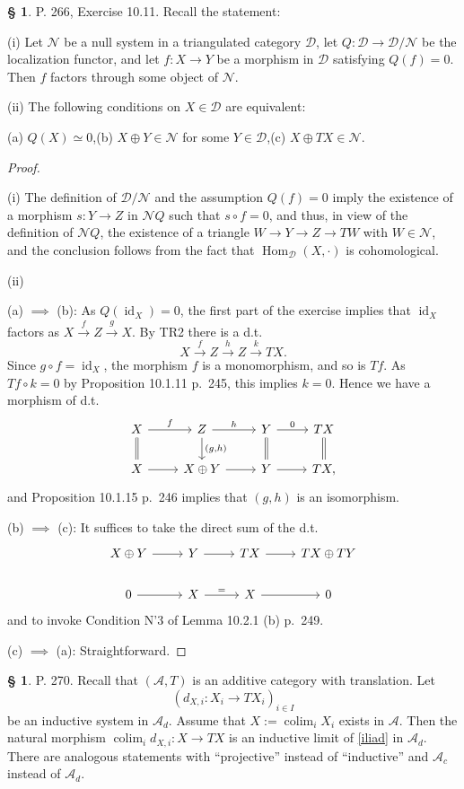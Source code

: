 \documentclass[12pt]{article}
\theoremstyle{remark}
\theoremstyle{definition}
\newtheorem{s}[thm]{\S}
\newcommand{\cc}{\mathcal}
\newcommand{\A}{\mathcal A}
\newcommand{\xr}{\xrightarrow}
\DeclareMathOperator*{\co}{colim}
\DeclareMathOperator{\id}{id}
\DeclareMathOperator{\Hom}{Hom}%
\begin{document}
\begin{s} P. 266, Exercise 10.11. Recall the statement: 

\noindent(i) Let $\cc N$ be a null system in a triangulated category $\cc D$, let $Q:\cc D\to\cc D/\cc N$ be the localization functor, and let $f:X\to Y$ be a morphism in $\cc D$ satisfying $Q(f)=0$. Then $f$ factors through some object of $\cc N$. 

\noindent(ii) The following conditions on $X\in\cc D$ are equivalent: 

\noindent(a) $Q(X)\simeq0$,\quad(b) $X\oplus Y\in\cc N$ for some $Y\in\cc D$,\quad(c) $X\oplus TX\in\cc N$.

\begin{proof}\ 

\noindent(i) The definition of $\cc D/\cc N$ and the assumption $Q(f)=0$ imply the existence of a morphism $s:Y\to Z$ in $\cc NQ$ such that $s\circ f=0$, and thus, in view of the definition of $\cc NQ$, the existence of a triangle $W\to Y\to Z\to TW$ with $W\in\cc N$, and the conclusion follows from the fact that $\Hom_{\cc D}(X,\cdot)$ is cohomological. 

\noindent(ii)

\noindent(a) $\implies$ (b): As $Q(\id_X)=0$, the first part of the exercise implies that $\id_X$ factors as $X\xr fZ\xr g X$. By TR2 there is a d.t. 
$$
X\xr fZ\xr hZ\xr kTX.
$$ 
Since $g\circ f=\id_X$, the morphism $f$ is a monomorphism, and so is $Tf$. As $Tf\circ k=0$ by Proposition 10.1.11 p.~245, this implies $k=0$. Hence we have a morphism of d.t. 
$$
\begin{tikzcd}
X\ar[equal]{d}\ar{r}{f}&Z\ar{d}{(g,h)}\ar{r}{h}&Y\ar[equal]{d}\ar{r}{0}&TX\ar[equal]{d}\\ 
X\ar{r}&X\oplus Y\ar{r}&Y\ar{r}&TX,
\end{tikzcd}
$$
and Proposition 10.1.15 p.~246 implies that $(g,h)$ is an isomorphism.\bigskip 

\noindent(b) $\implies$ (c): It suffices to take the direct sum of the d.t. 
$$
\begin{tikzcd} 
X\oplus Y\ar{r}&Y\ar{r}&TX\ar{r}&TX\oplus TY\\ 
0\ar{r}&X\ar{r}{=}&X\ar{r}&0
\end{tikzcd}
$$
and to invoke Condition N'3 of Lemma 10.2.1 (b) p.~249. 

\noindent(c) $\implies$ (a): Straightforward.
\end{proof}
\end{s}
%
%
\begin{s}\label{pg270} 
P. 270. Recall that $(\A,T)$ is an additive category with translation. Let 
\begin{equation}\label{iliad}
(d_{X,i}:X_i\to TX_i)_{i\in I}
\end{equation} 
be an inductive system in $\A_d$. Assume that $X:=\co_iX_i$ exists in $\A$. Then the natural morphism $\co_id_{X,i}:X\to TX$ is an inductive limit of \eqref{iliad} in $\A_d$. There are analogous statements with ``projective'' instead of ``inductive'' and $\A_c$ instead of $\A_d$.
\end{s}
\end{document}
